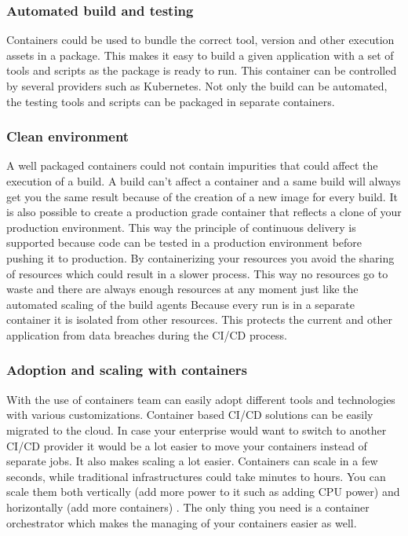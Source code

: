 \subsubsection{Automated build and testing}
Containers could be used to bundle the correct tool, version and other execution assets in a package. This makes it easy to build a given application with a set of tools and scripts as the package is ready to run. This container can be controlled by several providers such as Kubernetes.
Not only the build can be automated, the testing tools and scripts can be packaged in separate containers.

\subsubsection{Clean environment}
A well packaged containers could not contain impurities that could affect the execution of a build. A build can’t affect a container and a same build will always get you the same result because of the creation of a new image for every build. 
It is also possible to create a production grade container that reflects a clone of your production environment. This way the principle of continuous delivery is supported because code can be tested in a production environment before pushing it to production.
By containerizing your resources you avoid the sharing of resources which could result in a slower process. This way no resources go to waste and there are always enough resources at any moment just like the automated scaling of the build agents
Because every run is in a separate container it is isolated from other resources. This protects the current and other application from data breaches during the CI/CD process.

\subsubsection{Adoption and scaling with containers}
With the use of containers team can easily adopt different tools and technologies with various customizations. Container based CI/CD solutions can be easily migrated to the cloud. In case your enterprise would want to switch to another CI/CD provider it would be a lot easier to move your containers instead of separate jobs. 
It also makes scaling a lot easier. Containers can scale in a few seconds, while traditional infrastructures could take minutes to hours. You can scale them both vertically (add more power to it such as adding CPU power) and horizontally (add more containers) \autocite{Samant2021}. The only thing you need is a container orchestrator which makes the managing of your containers easier as well.


